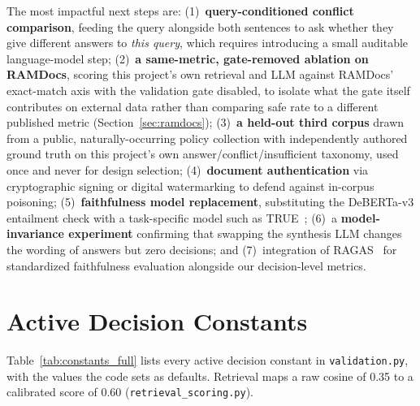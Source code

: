 \documentclass[conference]{IEEEtran}
\begin{document}
The most impactful next steps are: (1)~\textbf{query-conditioned
conflict comparison}, feeding the query alongside both sentences to ask
whether they give different answers to \textit{this query}, which
requires introducing a small auditable language-model step;
(2)~\textbf{a same-metric, gate-removed ablation on RAMDocs}, scoring this
project's own retrieval and LLM against RAMDocs' exact-match axis with the
validation gate disabled, to isolate what the gate itself contributes on
external data rather than comparing safe rate to a different published
metric (Section~\ref{sec:ramdocs}); (3)~\textbf{a held-out
third corpus} drawn from a public, naturally-occurring policy collection
with independently authored ground truth on this project's own
answer/conflict/insufficient taxonomy, used once and never for design
selection; (4)~\textbf{document authentication}
via cryptographic signing or digital watermarking to defend against
in-corpus poisoning; (5)~\textbf{faithfulness model replacement},
substituting the DeBERTa-v3 entailment check with a task-specific
model such as TRUE~\cite{honovich2022true}; (6)~a
\textbf{model-invariance experiment} confirming that swapping the
synthesis LLM changes the wording of answers but zero decisions; and
(7)~integration of RAGAS~\cite{es2023ragas} for standardized
faithfulness evaluation alongside our decision-level metrics.

\appendix
\section{Active Decision Constants}
\label{app:constants}

Table~\ref{tab:constants_full} lists every active decision constant in
\texttt{validation.py}, with the values the code sets as defaults. Retrieval
maps a raw cosine of 0.35 to a calibrated score of 0.60
(\texttt{retrieval\_scoring.py}).
\end{document}
